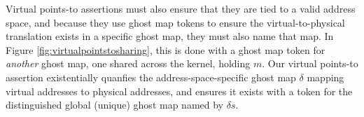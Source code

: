 Virtual points-to assertions must also ensure that they are tied to a valid address space, and because they
use ghost map tokens to ensure the virtual-to-physical translation exists in a specific ghost map, they must also
name that map. In Figure \ref{fig:virtualpointstosharing}, this is done with a ghost map token for \emph{another} ghost map,
one shared across the kernel, holding $m$. Our virtual points-to assertion existentially quanfies the address-space-specific
ghost map $\delta$ mapping virtual addresses to physical addresses, and ensures it exists with a token for the distinguished
global (unique) ghost map named by $\delta{s}$.
  

